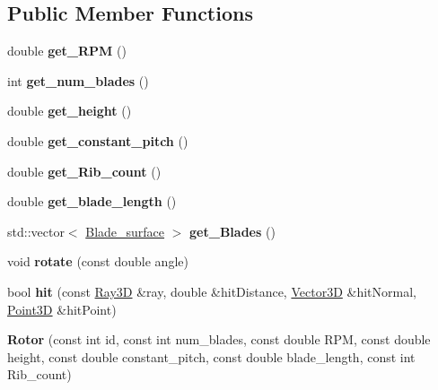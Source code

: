 \subsection*{Public Member Functions}
\begin{DoxyCompactItemize}
\item 
\hypertarget{class_rotor_af922b65832291cafdb53c52a545ac136}{}\label{class_rotor_af922b65832291cafdb53c52a545ac136} 
double {\bfseries get\+\_\+\+R\+PM} ()
\item 
\hypertarget{class_rotor_a25eef55d0719b86a255d3aa09f7a2688}{}\label{class_rotor_a25eef55d0719b86a255d3aa09f7a2688} 
int {\bfseries get\+\_\+num\+\_\+blades} ()
\item 
\hypertarget{class_rotor_ad0c276d01564fbdda8ca63c7eff18df6}{}\label{class_rotor_ad0c276d01564fbdda8ca63c7eff18df6} 
double {\bfseries get\+\_\+height} ()
\item 
\hypertarget{class_rotor_a53d18f1d59a1c2b71cdb8c9cab0acd4c}{}\label{class_rotor_a53d18f1d59a1c2b71cdb8c9cab0acd4c} 
double {\bfseries get\+\_\+constant\+\_\+pitch} ()
\item 
\hypertarget{class_rotor_af384431ad8eba046b8541ac5d1a3f9f9}{}\label{class_rotor_af384431ad8eba046b8541ac5d1a3f9f9} 
double {\bfseries get\+\_\+\+Rib\+\_\+count} ()
\item 
\hypertarget{class_rotor_a43485a289837aab864e28dc00109fdf6}{}\label{class_rotor_a43485a289837aab864e28dc00109fdf6} 
double {\bfseries get\+\_\+blade\+\_\+length} ()
\item 
\hypertarget{class_rotor_a31c1b1a9674d87d0b612db4989a4ae16}{}\label{class_rotor_a31c1b1a9674d87d0b612db4989a4ae16} 
std\+::vector$<$ \hyperlink{class_blade__surface}{Blade\+\_\+surface} $>$ {\bfseries get\+\_\+\+Blades} ()
\item 
\hypertarget{class_rotor_ac73f8ab43793bc45b978c6ef14239a4c}{}\label{class_rotor_ac73f8ab43793bc45b978c6ef14239a4c} 
void {\bfseries rotate} (const double angle)
\item 
\hypertarget{class_rotor_ab1ecb2c8efc6e125db1fe9121c6c47b9}{}\label{class_rotor_ab1ecb2c8efc6e125db1fe9121c6c47b9} 
bool {\bfseries hit} (const \hyperlink{class_ray3_d}{Ray3D} \&ray, double \&hit\+Distance, \hyperlink{class_vector3_d}{Vector3D} \&hit\+Normal, \hyperlink{class_point3_d}{Point3D} \&hit\+Point)
\item 
\hypertarget{class_rotor_ad525c69ea4ba137f953675839befcaa6}{}\label{class_rotor_ad525c69ea4ba137f953675839befcaa6} 
{\bfseries Rotor} (const int id, const int num\+\_\+blades, const double R\+PM, const double height, const double constant\+\_\+pitch, const double blade\+\_\+length, const int Rib\+\_\+count)
\end{DoxyCompactItemize}
